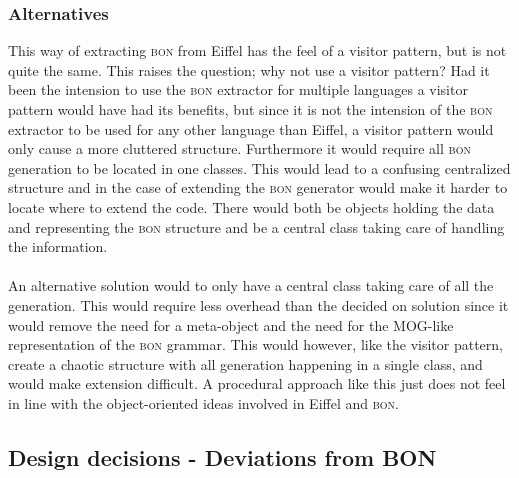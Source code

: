 \subsubsection{Alternatives}
This way of extracting \textsc{bon} from Eiffel has the feel of a visitor pattern, but is not quite the same. This raises the question; why not use a visitor pattern? Had it been the intension to use the \textsc{bon} extractor for multiple languages a visitor pattern would have had its benefits, but since it is not the intension of the \textsc{bon} extractor to be used for any other language than Eiffel, a visitor pattern would only cause a more cluttered structure. Furthermore it would require all \textsc{bon} generation to be located in one classes. This would lead to a confusing centralized structure and in the case of extending the \textsc{bon} generator would make it harder to locate where to extend the code. There would both be objects holding the data and representing the \textsc{bon} structure and be a central class taking care of handling the information.
\paragraph{}
An alternative solution would to only have a central class taking care of all the generation. This would require less overhead than the decided on solution since it would remove the need for a meta-object and the need for the MOG-like representation of the \textsc{bon} grammar. This would however, like the visitor pattern, create a chaotic structure with all generation happening in a single class, and would make extension difficult. A procedural approach like this just does not feel in line with the object-oriented ideas involved in Eiffel and \textsc{bon}.

\subsection{Design decisions - Deviations from BON}
\label{deviations_from_bon}\cite{walden1995}

